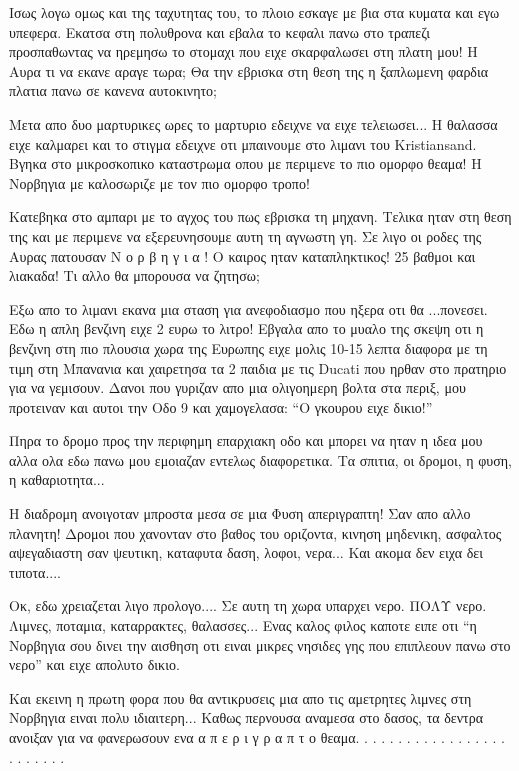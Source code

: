 Ισως λογω ομως και της ταχυτητας του, το πλοιο εσκαγε με βια στα κυματα και εγω υπεφερα. Εκατσα στη πολυθρονα και εβαλα το κεφαλι πανω στο τραπεζι προσπαθωντας να ηρεμησω το στομαχι που ειχε σκαρφαλωσει στη πλατη μου! Η Αυρα τι να εκανε αραγε τωρα; Θα την εβρισκα στη θεση της η ξαπλωμενη φαρδια πλατια πανω σε κανενα αυτοκινητο; 

Μετα απο δυο μαρτυρικες ωρες το μαρτυριο εδειχνε να ειχε τελειωσει... Η θαλασσα ειχε καλμαρει και το στιγμα εδειχνε οτι μπαινουμε στο λιμανι του Kristiansand. 
Βγηκα στο μικροσκοπικο καταστρωμα οπου με περιμενε το πιο ομορφο θεαμα! Η Νορβηγια με καλοσωριζε με τον πιο ομορφο τροπο! 


Κατεβηκα στο αμπαρι με το αγχος του πως εβρισκα τη μηχανη. Τελικα ηταν στη θεση της και με περιμενε να εξερευνησουμε αυτη τη αγνωστη γη. 
Σε λιγο οι ροδες της Αυρας πατουσαν Ν ο ρ β η γ ι α ! 
Ο καιρος ηταν καταπληκτικος! 25 βαθμοι και λιακαδα! Τι αλλο θα μπορουσα να ζητησω; 


Εξω απο το λιμανι εκανα μια σταση για ανεφοδιασμο που ηξερα οτι θα ...πονεσει. Εδω η απλη βενζινη ειχε 2 ευρω το λιτρο! Εβγαλα απο το μυαλο της σκεψη οτι η βενζινη στη πιο πλουσια χωρα της Ευρωπης ειχε μολις 10-15 λεπτα διαφορα με τη τιμη στη Μπανανια και χαιρετησα τα 2 παιδια με τις Ducati που ηρθαν στο πρατηριο για να γεμισουν. Δανοι που γυριζαν απο μια ολιγοημερη βολτα στα περιξ, μου προτειναν και αυτοι την Οδο 9 και χαμογελασα: ``Ο γκουρου ειχε δικιο!''

Πηρα το δρομο προς την περιφημη επαρχιακη οδο και μπορει να ηταν η ιδεα μου αλλα ολα εδω πανω μου εμοιαζαν εντελως διαφορετικα. Τα σπιτια, οι δρομοι, η φυση, η καθαριοτητα... 


H διαδρομη ανοιγοταν μπροστα μεσα σε μια Φυση απεριγραπτη! Σαν απο αλλο πλανητη! Δρομοι που χανονταν στο βαθος του οριζοντα, κινηση μηδενικη, ασφαλτος αψεγαδιαστη σαν ψευτικη, καταφυτα δαση, λοφοι, νερα...
Και ακομα δεν ειχα δει τιποτα.... 


Οκ, εδω χρειαζεται λιγο προλογο....
Σε αυτη τη χωρα υπαρχει νερο. ΠΟΛΥ νερο. Λιμνες, ποταμια, καταρρακτες, θαλασσες... 
Ενας καλος φιλος καποτε ειπε οτι ``η Νορβηγια σου δινει την αισθηση οτι ειναι μικρες νησιδες γης που επιπλεουν πανω στο νερο'' και ειχε απολυτο δικιο.

Και εκεινη η πρωτη φορα που θα αντικρυσεις μια απο τις αμετρητες λιμνες στη Νορβηγια ειναι πολυ ιδιαιτερη... 
Καθως περνουσα αναμεσα στο δασος, τα δεντρα ανοιξαν για να φανερωσουν ενα α π ε ρ ι γ ρ α π τ ο θεαμα.
.
.
.
.
.
.
.
.
.
.
.
.
.
.
.
.
.
.
.
.
.
.
.
.

